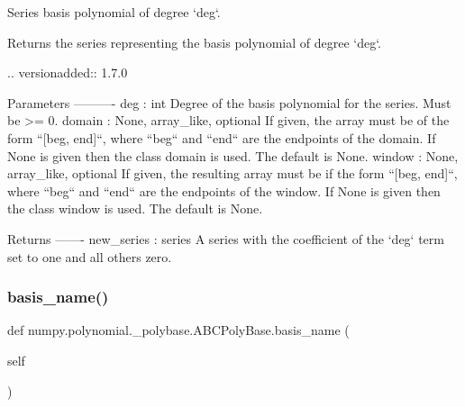 \begin{DoxyVerb}Series basis polynomial of degree `deg`.

Returns the series representing the basis polynomial of degree `deg`.

.. versionadded:: 1.7.0

Parameters
----------
deg : int
    Degree of the basis polynomial for the series. Must be >= 0.
domain : {None, array_like}, optional
    If given, the array must be of the form ``[beg, end]``, where
    ``beg`` and ``end`` are the endpoints of the domain. If None is
    given then the class domain is used. The default is None.
window : {None, array_like}, optional
    If given, the resulting array must be if the form
    ``[beg, end]``, where ``beg`` and ``end`` are the endpoints of
    the window. If None is given then the class window is used. The
    default is None.

Returns
-------
new_series : series
    A series with the coefficient of the `deg` term set to one and
    all others zero.\end{DoxyVerb}
 \mbox{\label{classnumpy_1_1polynomial_1_1__polybase_1_1ABCPolyBase_af165175903af028d6be1002e12699383}} 
\subsubsection{\texorpdfstring{basis\+\_\+name()}{basis\_name()}}
{\footnotesize\ttfamily def numpy.\+polynomial.\+\_\+polybase.\+A\+B\+C\+Poly\+Base.\+basis\+\_\+name (\begin{DoxyParamCaption}\item[{}]{self }\end{DoxyParamCaption})}

\mbox{\label{classnumpy_1_1polynomial_1_1__polybase_1_1ABCPolyBase_a5ba30a478c40f03ea67c4b16f38f91d0}} 
